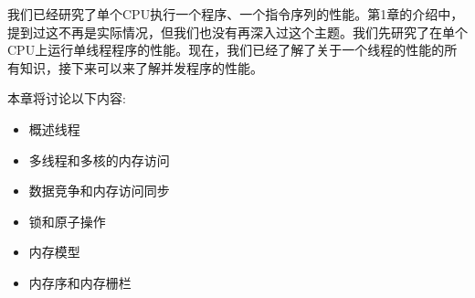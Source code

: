 我们已经研究了单个CPU执行一个程序、一个指令序列的性能。第1章的介绍中，提到过这不再是实际情况，但我们也没有再深入过这个主题。我们先研究了在单个CPU上运行单线程程序的性能。现在，我们已经了解了关于一个线程的性能的所有知识，接下来可以来了解并发程序的性能。

本章将讨论以下内容:

\begin{itemize}
\item 概述线程
\item 多线程和多核的内存访问
\item 数据竞争和内存访问同步
\item 锁和原子操作
\item 内存模型
\item 内存序和内存栅栏
\end{itemize}
